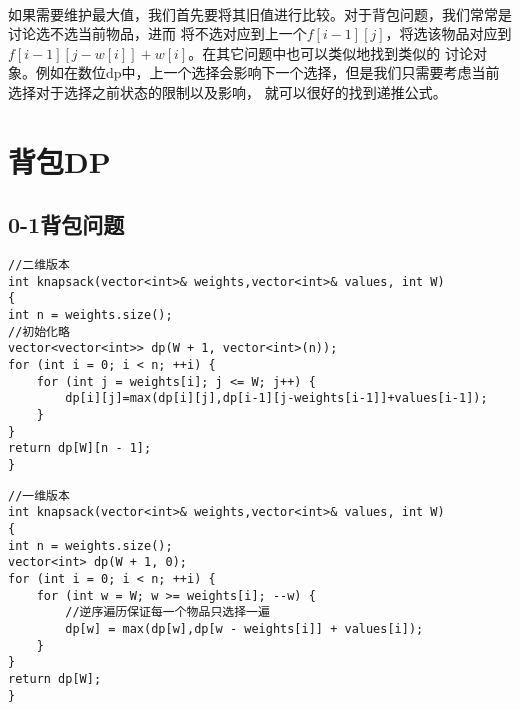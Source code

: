 \documentclass[12pt,a4paper,UTF16]{ctexbook}
\theoremstyle{plain}
\begin{document}
\paragraph{}如果需要维护最大值，我们首先要将其旧值进行比较。对于背包问题，我们常常是讨论选不选当前物品，进而
将不选对应到上一个$f[i-1][j]$，将选该物品对应到$f[i-1][j-w[i]] + w[i]$。在其它问题中也可以类似地找到类似的
讨论对象。例如在数位dp中，上一个选择会影响下一个选择，但是我们只需要考虑当前选择对于选择之前状态的限制以及影响，
就可以很好的找到递推公式。
\section{背包DP}
\subsection{0-1背包问题}
\begin{lstlisting}
//二维版本
int knapsack(vector<int>& weights,vector<int>& values, int W) 
{
int n = weights.size();
//初始化略
vector<vector<int>> dp(W + 1, vector<int>(n));
for (int i = 0; i < n; ++i) {
    for (int j = weights[i]; j <= W; j++) {
        dp[i][j]=max(dp[i][j],dp[i-1][j-weights[i-1]]+values[i-1]);
    }
}
return dp[W][n - 1];
}
\end{lstlisting}
\begin{lstlisting}
//一维版本
int knapsack(vector<int>& weights,vector<int>& values, int W) 
{
int n = weights.size();
vector<int> dp(W + 1, 0);
for (int i = 0; i < n; ++i) {
    for (int w = W; w >= weights[i]; --w) {
        //逆序遍历保证每一个物品只选择一遍
        dp[w] = max(dp[w],dp[w - weights[i]] + values[i]);
    }
}
return dp[W];
}
\end{lstlisting}
\end{document}
